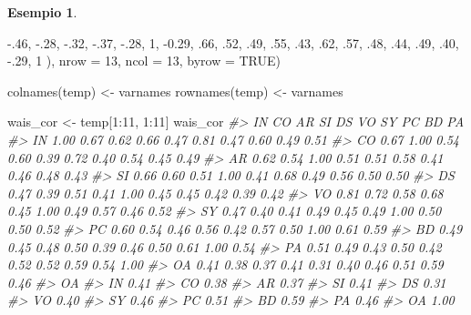 \documentclass[
  11pt,
]{krantz}
\makeatletter
\newenvironment{Shaded}{\begin{snugshade}}{\end{snugshade}}
\newcommand{\AttributeTok}[1]{\textcolor[rgb]{0.61,0.61,0.61}{#1}}
\newcommand{\CommentTok}[1]{\textcolor[rgb]{0.37,0.37,0.37}{\textit{#1}}}
\newcommand{\ConstantTok}[1]{\textcolor[rgb]{0,0,0}{#1}}
\newcommand{\DecValTok}[1]{\textcolor[rgb]{0.06,0.06,0.06}{#1}}
\newcommand{\FloatTok}[1]{\textcolor[rgb]{0.06,0.06,0.06}{#1}}
\newcommand{\FunctionTok}[1]{\textcolor[rgb]{0,0,0}{#1}}
\newcommand{\NormalTok}[1]{#1}
\newcommand{\OtherTok}[1]{\textcolor[rgb]{0.37,0.37,0.37}{#1}}
\newcommand{\SpecialCharTok}[1]{\textcolor[rgb]{0,0,0}{#1}}
\newenvironment{kframe}{%
\medskip{}
\setlength{\fboxsep}{.8em}
 \def\at@end@of@kframe{}%
 \ifinner\ifhmode%
  \def\at@end@of@kframe{\end{minipage}}%
  \begin{minipage}{\columnwidth}%
 \fi\fi%
 \def\FrameCommand##1{\hskip\@totalleftmargin \hskip-\fboxsep
 \colorbox{shadecolor}{##1}\hskip-\fboxsep
     \hskip-\linewidth \hskip-\@totalleftmargin \hskip\columnwidth}%
 \MakeFramed {\advance\hsize-\width
   \@totalleftmargin\z@ \linewidth\hsize
   \@setminipage}}%
 {\par\unskip\endMakeFramed%
 \at@end@of@kframe}
\renewenvironment{Shaded}{\begin{kframe}}{\end{kframe}}
\theoremstyle{definition}
\theoremstyle{definition}
\newtheorem{example}{Esempio}[chapter]
\theoremstyle{definition}
\theoremstyle{definition}
\theoremstyle{remark}
\makeatother
\begin{document}
\begin{example}
\begin{Shaded}
\begin{Highlighting}[]
  \SpecialCharTok{{-}}\NormalTok{.}\DecValTok{46}\NormalTok{, }\SpecialCharTok{{-}}\NormalTok{.}\DecValTok{28}\NormalTok{, }\SpecialCharTok{{-}}\NormalTok{.}\DecValTok{32}\NormalTok{, }\SpecialCharTok{{-}}\NormalTok{.}\DecValTok{37}\NormalTok{, }\SpecialCharTok{{-}}\NormalTok{.}\DecValTok{28}\NormalTok{, }\DecValTok{1}\NormalTok{, }\SpecialCharTok{{-}}\FloatTok{0.29}\NormalTok{, .}\DecValTok{66}\NormalTok{, .}\DecValTok{52}\NormalTok{, .}\DecValTok{49}\NormalTok{, .}\DecValTok{55}\NormalTok{, .}\DecValTok{43}\NormalTok{,}
\NormalTok{  .}\DecValTok{62}\NormalTok{, .}\DecValTok{57}\NormalTok{, .}\DecValTok{48}\NormalTok{, .}\DecValTok{44}\NormalTok{, .}\DecValTok{49}\NormalTok{, .}\DecValTok{40}\NormalTok{, }\SpecialCharTok{{-}}\NormalTok{.}\DecValTok{29}\NormalTok{, }\DecValTok{1}
\NormalTok{), }\AttributeTok{nrow =} \DecValTok{13}\NormalTok{, }\AttributeTok{ncol =} \DecValTok{13}\NormalTok{, }\AttributeTok{byrow =} \ConstantTok{TRUE}\NormalTok{)}

\FunctionTok{colnames}\NormalTok{(temp) }\OtherTok{\textless{}{-}}\NormalTok{ varnames}
\FunctionTok{rownames}\NormalTok{(temp) }\OtherTok{\textless{}{-}}\NormalTok{ varnames}

\NormalTok{wais\_cor }\OtherTok{\textless{}{-}}\NormalTok{ temp[}\DecValTok{1}\SpecialCharTok{:}\DecValTok{11}\NormalTok{, }\DecValTok{1}\SpecialCharTok{:}\DecValTok{11}\NormalTok{]}
\NormalTok{wais\_cor}
\CommentTok{\#\textgreater{}      IN   CO   AR   SI   DS   VO   SY   PC   BD   PA}
\CommentTok{\#\textgreater{} IN 1.00 0.67 0.62 0.66 0.47 0.81 0.47 0.60 0.49 0.51}
\CommentTok{\#\textgreater{} CO 0.67 1.00 0.54 0.60 0.39 0.72 0.40 0.54 0.45 0.49}
\CommentTok{\#\textgreater{} AR 0.62 0.54 1.00 0.51 0.51 0.58 0.41 0.46 0.48 0.43}
\CommentTok{\#\textgreater{} SI 0.66 0.60 0.51 1.00 0.41 0.68 0.49 0.56 0.50 0.50}
\CommentTok{\#\textgreater{} DS 0.47 0.39 0.51 0.41 1.00 0.45 0.45 0.42 0.39 0.42}
\CommentTok{\#\textgreater{} VO 0.81 0.72 0.58 0.68 0.45 1.00 0.49 0.57 0.46 0.52}
\CommentTok{\#\textgreater{} SY 0.47 0.40 0.41 0.49 0.45 0.49 1.00 0.50 0.50 0.52}
\CommentTok{\#\textgreater{} PC 0.60 0.54 0.46 0.56 0.42 0.57 0.50 1.00 0.61 0.59}
\CommentTok{\#\textgreater{} BD 0.49 0.45 0.48 0.50 0.39 0.46 0.50 0.61 1.00 0.54}
\CommentTok{\#\textgreater{} PA 0.51 0.49 0.43 0.50 0.42 0.52 0.52 0.59 0.54 1.00}
\CommentTok{\#\textgreater{} OA 0.41 0.38 0.37 0.41 0.31 0.40 0.46 0.51 0.59 0.46}
\CommentTok{\#\textgreater{}      OA}
\CommentTok{\#\textgreater{} IN 0.41}
\CommentTok{\#\textgreater{} CO 0.38}
\CommentTok{\#\textgreater{} AR 0.37}
\CommentTok{\#\textgreater{} SI 0.41}
\CommentTok{\#\textgreater{} DS 0.31}
\CommentTok{\#\textgreater{} VO 0.40}
\CommentTok{\#\textgreater{} SY 0.46}
\CommentTok{\#\textgreater{} PC 0.51}
\CommentTok{\#\textgreater{} BD 0.59}
\CommentTok{\#\textgreater{} PA 0.46}
\CommentTok{\#\textgreater{} OA 1.00}
\end{Highlighting}
\end{Shaded}


\end{example}
\end{document}
